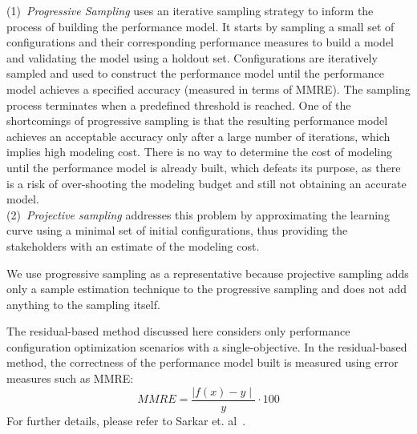\documentclass[10pt,journal,compsoc]{IEEEtran}
\begin{document}
(1)~\textit{Progressive Sampling} uses an iterative sampling strategy to inform the process of building the performance model. It starts by sampling a small set of configurations and their corresponding performance measures to build a model and validating the model using a holdout set. Configurations are iteratively sampled and used to construct the performance model until the performance model achieves a specified accuracy (measured in terms of MMRE). The sampling process terminates when a predefined threshold is reached.
One of the shortcomings of progressive sampling is that the resulting performance model achieves an acceptable accuracy only after a large number of iterations, which implies high modeling cost. There is no way to determine the cost of modeling until the performance model is already built, which defeats its purpose, as there is a risk of over-shooting the modeling budget and still not obtaining an accurate model. \\
(2)~\textit{Projective sampling} addresses this problem by approximating the learning curve using a minimal set of initial configurations, thus providing the stakeholders with an estimate of the modeling cost.


We use progressive sampling as a representative because projective sampling adds only a sample estimation technique to the progressive sampling and does not add anything to the sampling itself.


The residual-based method discussed here considers only performance configuration optimization scenarios with a single-objective. In the residual-based method, the correctness of the performance model built is measured using error measures such as MMRE:
\begin{equation}
\mathit{MMRE}=\frac{\mid\mathit{f(x)} - \mathit{y}\mid}{\mathit{y}} \cdot 100
\label{eq:err}
\end{equation}
For further details, please refer to Sarkar et. al~\cite{sarkar2015cost}.
\end{document}

